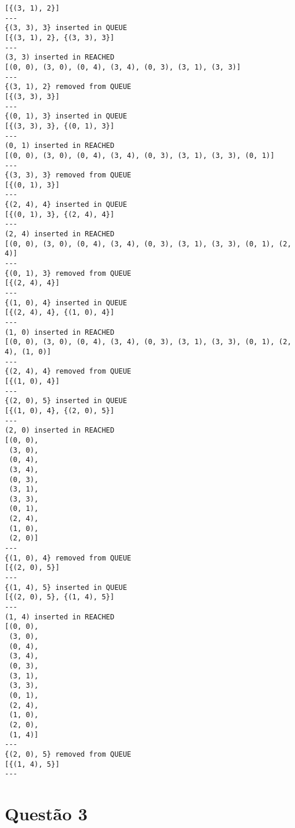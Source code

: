 \documentclass{article}
\begin{document}
\begin{verbatim}
[{(3, 1), 2}]
---
{(3, 3), 3} inserted in QUEUE
[{(3, 1), 2}, {(3, 3), 3}]
---
(3, 3) inserted in REACHED
[(0, 0), (3, 0), (0, 4), (3, 4), (0, 3), (3, 1), (3, 3)]
---
{(3, 1), 2} removed from QUEUE
[{(3, 3), 3}]
---
{(0, 1), 3} inserted in QUEUE
[{(3, 3), 3}, {(0, 1), 3}]
---
(0, 1) inserted in REACHED
[(0, 0), (3, 0), (0, 4), (3, 4), (0, 3), (3, 1), (3, 3), (0, 1)]
---
{(3, 3), 3} removed from QUEUE
[{(0, 1), 3}]
---
{(2, 4), 4} inserted in QUEUE
[{(0, 1), 3}, {(2, 4), 4}]
---
(2, 4) inserted in REACHED
[(0, 0), (3, 0), (0, 4), (3, 4), (0, 3), (3, 1), (3, 3), (0, 1), (2, 4)]
---
{(0, 1), 3} removed from QUEUE
[{(2, 4), 4}]
---
{(1, 0), 4} inserted in QUEUE
[{(2, 4), 4}, {(1, 0), 4}]
---
(1, 0) inserted in REACHED
[(0, 0), (3, 0), (0, 4), (3, 4), (0, 3), (3, 1), (3, 3), (0, 1), (2, 4), (1, 0)]
---
{(2, 4), 4} removed from QUEUE
[{(1, 0), 4}]
---
{(2, 0), 5} inserted in QUEUE
[{(1, 0), 4}, {(2, 0), 5}]
---
(2, 0) inserted in REACHED
[(0, 0),
 (3, 0),
 (0, 4),
 (3, 4),
 (0, 3),
 (3, 1),
 (3, 3),
 (0, 1),
 (2, 4),
 (1, 0),
 (2, 0)]
---
{(1, 0), 4} removed from QUEUE
[{(2, 0), 5}]
---
{(1, 4), 5} inserted in QUEUE
[{(2, 0), 5}, {(1, 4), 5}]
---
(1, 4) inserted in REACHED
[(0, 0),
 (3, 0),
 (0, 4),
 (3, 4),
 (0, 3),
 (3, 1),
 (3, 3),
 (0, 1),
 (2, 4),
 (1, 0),
 (2, 0),
 (1, 4)]
---
{(2, 0), 5} removed from QUEUE
[{(1, 4), 5}]
---
\end{verbatim}

\newpage

\section{Questão 3}
\end{document}
